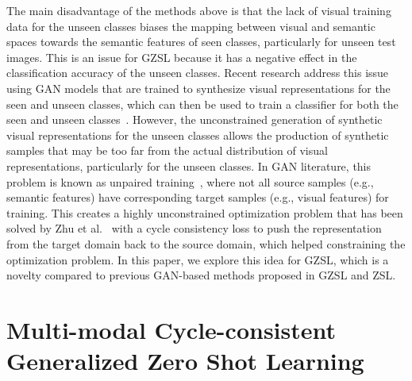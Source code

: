 \documentclass[runningheads]{llncs}
\begin{document}
The main disadvantage of the methods above is that the lack of visual training data for the unseen classes biases the mapping between visual and semantic spaces towards the semantic features of seen classes, particularly for unseen test images.  This is an issue for GZSL because it has a negative effect in the classification accuracy of the unseen classes.  Recent research address this issue using GAN models that are trained to synthesize visual representations for the seen and unseen classes, which can then be used to train a classifier for both the seen and unseen classes~\cite{long2017zero,bucher2017generating}. However, the unconstrained generation of synthetic visual representations for the unseen classes allows the production of synthetic samples that may be too far from the actual distribution of visual representations, particularly for the unseen classes.  
In GAN literature, this problem is known as unpaired training~\cite{CycleGAN2017}, where not all source samples (e.g., semantic features) have corresponding target samples (e.g., visual features) for training.  This creates a highly unconstrained optimization problem that has been solved by Zhu et al.~\cite{CycleGAN2017} with a cycle consistency loss to push the representation from the target domain back to the source domain, which helped constraining the optimization problem.  In this paper, we explore this idea for GZSL, which is a novelty compared to previous GAN-based methods proposed in GZSL and ZSL.  



\section{Multi-modal Cycle-consistent Generalized Zero Shot Learning}
\label{sec:method}
\end{document}
